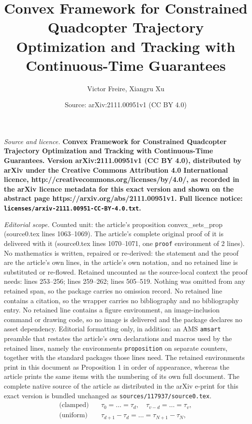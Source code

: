 \documentclass[10pt,a4paper]{amsart}
\title{\LARGE \bf Convex Framework for Constrained Quadcopter Trajectory Optimization and Tracking with Continuous-Time Guarantees}
\author{Victor Freire, Xiangru Xu}
\date{Source: arXiv:2111.00951v1 (CC BY 4.0)}
\begin{document}
\maketitle

\noindent\emph{Source and licence.} \LARGE \bf Convex Framework for Constrained Quadcopter Trajectory Optimization and Tracking with Continuous-Time Guarantees. Version arXiv:2111.00951v1 (CC BY 4.0), distributed by arXiv under the Creative Commons Attribution 4.0 International licence, http://creativecommons.org/licenses/by/4.0/, as recorded in the arXiv licence metadata for this exact version and shown on the abstract page https://arxiv.org/abs/2111.00951v1. Full licence notice: \texttt{licenses/arxiv-2111.00951-CC-BY-4.0.txt}.\par\smallskip

\noindent\textit{Editorial scope.} Counted unit: the article's proposition convex\_sets\_prop (source0.tex lines 1063--1069). The article's complete original proof of it is delivered with it (source0.tex lines 1070--1071, one \texttt{proof} environment of 2 lines). No mathematics is written, repaired or re-derived: the statement and the proof are the article's own lines, in the article's own notation, and no retained line is substituted or re-flowed.  Retained uncounted as the source-local context the proof needs: lines 253--256; lines 259--262; lines 505--519.  Nothing was omitted from any retained span, so the package carries no omission record.  No retained line contains a citation, so the wrapper carries no bibliography and no bibliography entry.  No retained line contains a figure environment, an image-inclusion command or drawing code, so no image is delivered and the package declares no asset dependency.  Editorial formatting only, in addition: an AMS \texttt{amsart} preamble that restates the article's own declarations and macros used by the retained lines, namely the environments \texttt{proposition} on separate counters, together with the standard packages those lines need.  The retained environments print in this document as Proposition 1 in order of appearance, whereas the article prints the same items with the numbering of its own full document.  The complete native source of the article as distributed in the arXiv e-print for this exact version is bundled unchanged as \texttt{sources/117937/source0.tex}.
\begin{align}
    \text{(clamped)} \quad &\tau_0=\ldots=\tau_d, \quad \tau_{v-d}=\ldots=\tau_{v},\label{clamped}\\
    \text{(uniform)}\quad &\tau_{d+1}-\tau_{d}=\ldots =\tau_{N+1}-\tau_{N},\label{uniform}
\end{align}
\end{document}
